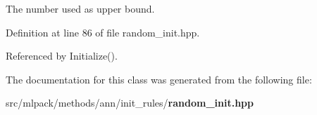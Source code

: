 The number used as upper bound. 



Definition at line 86 of file random\+\_\+init.\+hpp.



Referenced by Initialize().



The documentation for this class was generated from the following file\+:\begin{DoxyCompactItemize}
\item 
src/mlpack/methods/ann/init\+\_\+rules/{\bf random\+\_\+init.\+hpp}\end{DoxyCompactItemize}
